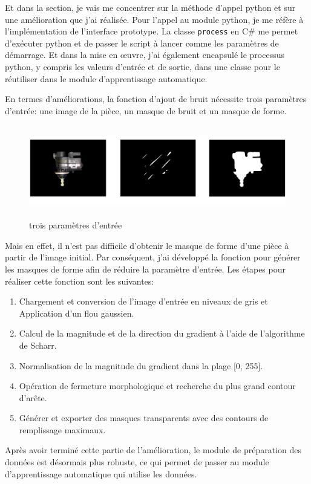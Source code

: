 Et dans la section, je vais me concentrer sur la méthode d'appel python et sur une amélioration que j'ai réalisée. Pour l'appel au module python, je me réfère à l'implémentation de l'interface prototype. La classe \texttt{process} en C\# me permet d'exécuter python et de passer le script à lancer comme les paramètres de démarrage. Et dans la mise en œuvre, j'ai également encapsulé le processus python, y compris les valeurs d'entrée et de sortie, dans une classe pour le réutiliser dans le module d'apprentissage automatique. 

En termes d'améliorations, la fonction d'ajout de bruit nécessite trois paramètres d'entrée: une image de la pièce, un masque de bruit et un masque de forme. 
\begin{figure}[H]
    \centering
    \includegraphics[height=4cm]{ressources/images/input_perlin.png}
    \caption{trois paramètres d'entrée}
\end{figure}
Mais en effet, il n'est pas difficile d'obtenir le masque de forme d'une pièce à partir de l'image initial. Par conséquent, j'ai développé la fonction pour générer les masques de forme afin de réduire la paramètre d'entrée. Les étapes pour réaliser cette fonction sont les suivantes: 
\begin{enumerate}
    \item Chargement et conversion de l'image d'entrée en niveaux de gris et Application d'un flou gaussien.
    \item Calcul de la magnitude et de la direction du gradient à l'aide de l'algorithme de Scharr.
    \item Normalisation de la magnitude du gradient dans la plage [0, 255].
    \item Opération de fermeture morphologique et recherche du plus grand contour d'arête.
    \item Générer et exporter des masques transparents avec des contours de remplissage maximaux.
\end{enumerate}

Après avoir terminé cette partie de l'amélioration, le module de préparation des données est désormais plus robuste, ce qui permet de passer au module d'apprentissage automatique qui utilise les données.

